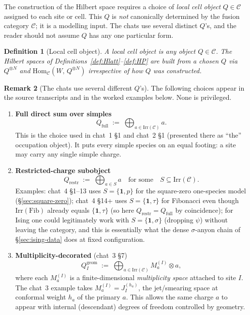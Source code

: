 \documentclass[11pt,a4paper]{article}
\newtheorem{definition}{Definition}[section]
\theoremstyle{definition}
\newtheorem{remark}[definition]{Remark}
\newcommand{\Cc}{\mathcal{C}}
\newcommand{\Irr}{\mathrm{Irr}}
\newcommand{\Hom}{\mathrm{Hom}}
\newcommand{\Fib}{\mathrm{Fib}}
\newcommand{\one}{\mathbf{1}}
\begin{document}
The construction of the Hilbert space requires a choice of \emph{local cell
object} $Q\in\Cc$ assigned to each site or cell. This $Q$ is \emph{not}
canonically determined by the fusion category $\Cc$; it is a modelling
input. The chats use several distinct $Q$'s, and the reader should not
assume $Q$ has any one particular form.

\begin{definition}[Local cell object]\label{def:Q}
A \emph{local cell object} is any object $Q\in\Cc$. The Hilbert spaces of
Definitions~\ref{def:Hlatt}--\ref{def:HP} are built from a chosen $Q$ via
$Q^{\otimes N}$ and $\Hom_\Cc(W,\,Q^{\otimes N})$ irrespective of how $Q$ was
constructed.
\end{definition}

\begin{remark}[The chats use several different $Q$'s]\label{rem:Q-choices}
The following choices appear in the source transcripts and in the worked
examples below. None is privileged.
\begin{enumerate}[label=(\arabic*)]
\item \textbf{Full direct sum over simples}
\[
Q_{\mathrm{full}} \;:=\; \bigoplus_{a\in\Irr(\Cc)} a.
\]
This is the choice used in chat~1 \S1 and chat~2 \S1 (presented there as
``the'' occupation object). It puts every simple species on an equal
footing: a site may carry any single simple charge.
\item \textbf{Restricted-charge subobject}
\[
Q_{\mathrm{restr}} \;:=\; \bigoplus_{a\in S} a \quad\text{for some}\quad S\subseteq\Irr(\Cc).
\]
Examples: chat~4 \S1--13 uses $S = \{\one, p\}$ for the square-zero
one-species model (\S\ref{sec:square-zero}); chat~4 \S14+ uses
$S = \{\one, \tau\}$ for Fibonacci even though $\Irr(\Fib)$ already equals
$\{\one,\tau\}$ (so here $Q_{\mathrm{restr}} = Q_{\mathrm{full}}$ by
coincidence); for Ising one could legitimately work with $S = \{\one,\sigma\}$
(dropping $\psi$) without leaving the category, and this is essentially what
the dense $\sigma$-anyon chain of \S\ref{sec:ising-data} does at fixed
configuration.
\item \textbf{Multiplicity-decorated} (chat~3 \S7)
\[
Q^{\mathrm{geom}}_I \;:=\; \bigoplus_{a\in\Irr(\Cc)} M_a^{(I)} \otimes a,
\]
where each $M_a^{(I)}$ is a finite-dimensional \emph{multiplicity space}
attached to site $I$. The chat~3 example takes $M_a^{(I)} = J_I^{(h_a)}$,
the jet/smearing space at conformal weight $h_a$ of the primary $a$.
This allows the same charge $a$ to appear with internal (descendant)
degrees of freedom controlled by geometry.

\end{enumerate}
\end{remark}
\end{document}
